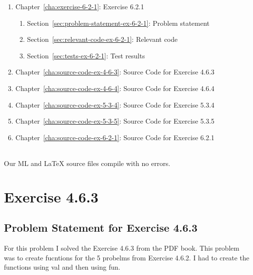 \documentclass{report}
\begin{document}
\begin{description}
\begin{enumerate}[{}]
\begin{enumerate}[{}]
    \item Section~\ref{sec:relevant-code-ex-5-3-5}: Relevant code
    \item Section~\ref{sec:tests-ex-5-3-5}: Test results
    \item Section~\ref{sec:exe-ex-5-3-5}: Execution Transcripts
    \end{enumerate}
  \item Chapter~\ref{cha:exercise-6-2-1}: Exercise 6.2.1
    \begin{enumerate}[{}]
    \item Section~\ref{sec:problem-statement-ex-6-2-1}: Problem statement
    \item Section~\ref{sec:relevant-code-ex-6-2-1}: Relevant code
    \item Section~\ref{sec:tests-ex-6-2-1}: Test results
    \end{enumerate}
  \item Chapter~\ref{cha:source-code-ex-4-6-3}: Source Code for Exercise
    4.6.3
  \item Chapter~\ref{cha:source-code-ex-4-6-4}: Source Code for Exercise
    4.6.4
  \item Chapter~\ref{cha:source-code-ex-5-3-4}: Source Code for Exercise
    5.3.4
  \item Chapter~\ref{cha:source-code-ex-5-3-5}: Source Code for Exercise
    5.3.5
  \item Chapter~\ref{cha:source-code-ex-6-2-1}: Source Code for Exercise
    6.2.1
  \end{enumerate}
\item[Reproducibility in ML and \LaTeX{}] \ \\
  Our ML and \LaTeX{} source files compile with no errors.
\end{description}


\chapter{Exercise 4.6.3}
\label{cha:exercise-4-6-3}

\section{Problem Statement for Exercise 4.6.3}
\label{sec:problem-statement-ex-4-6-3}
For this problem I solved the Exercise 4.6.3 from the PDF book.  This
problem was to create fucntions for the 5 probelms from Exercise
4.6.2. I had to create the functions using val and then using fun.
\end{document}
